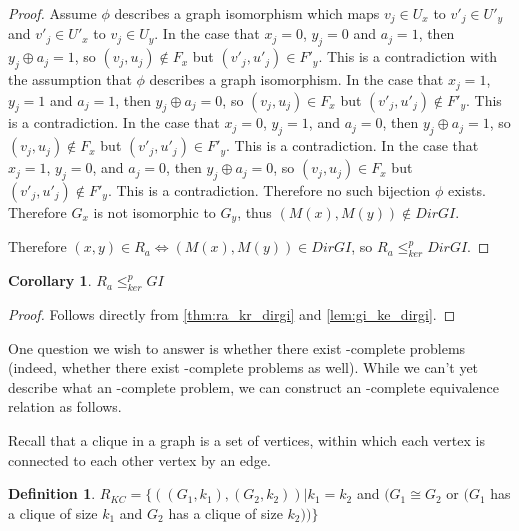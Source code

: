 \documentclass[draft]{article}
\newtheorem{corollary}{Corollary}%
\theoremstyle{definition}
\newtheorem{definition}{Definition}%
\newcommand{\kr}{\leq^{p}_{ker}} %
\begin{document}
\begin{proof}
  Assume $\phi$ describes a graph isomorphism which maps $v_j\in U_x$ to
  $v'_j\in U'_y$ and $v'_j\in U'_x$ to $v_j\in U_y$. In the case that $x_j=0$,
  $y_j=0$ and $a_j=1$, then $y_j\oplus a_j=1$, so $(v_j, u_j)\notin F_x$ but
  $(v'_j, u'_j)\in F'_y$. This is a contradiction with the assumption that
  $\phi$ describes a graph isomorphism. In the case that $x_j=1$, $y_j=1$ and
  $a_j=1$, then $y_j\oplus a_j=0$, so $(v_j, u_j)\in F_x$ but $(v'_j,
  u'_j)\notin F'_y$. This is a contradiction. In the case that $x_j=0$,
  $y_j=1$, and $a_j=0$, then $y_j\oplus a_j=1$, so $(v_j, u_j)\notin F_x$ but
  $(v'_j, u'_j)\in F'_y$. This is a contradiction. In the case that $x_j=1$,
  $y_j=0$, and $a_j=0$, then $y_j\oplus a_j=0$, so $(v_j, u_j)\in F_x$ but
  $(v'_j, u'_j)\notin F'_y$. This is a contradiction. Therefore no such
  bijection $\phi$ exists. Therefore $G_x$ is not isomorphic to $G_y$, thus
  $(M(x), M(y))\notin DirGI$.

  Therefore $(x, y)\in R_a\iff (M(x), M(y))\in DirGI$, so $R_a\kr DirGI$.
\end{proof}

\begin{corollary}$R_a\kr GI$\end{corollary}
\begin{proof}Follows directly from \autoref{thm:ra_kr_dirgi} and
  \autoref{lem:gi_ke_dirgi}.\end{proof}

One question we wish to answer is whether there exist \NPEq-complete problems
(indeed, whether there exist \PEq-complete problems as well). While we can't
yet describe what an \NPEq-complete problem, we can construct an \NP-complete
equivalence relation as follows.

Recall that a clique in a graph is a set of vertices, within which each vertex
is connected to each other vertex by an edge.

\begin{definition}
  $R_{KC}=\{((G_1, k_1), (G_2, k_2))| k_1=k_2$ and $(G_1\cong G_2$ or $(G_1$
  has a clique of size $k_1$ and $G_2$ has a clique of size $k_2))\}$
\end{definition}
\end{document}
